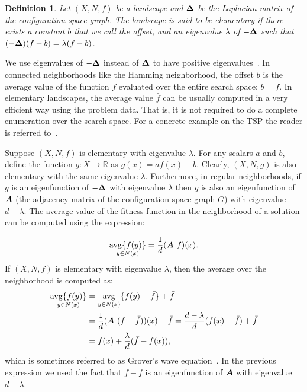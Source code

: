 \documentclass{article}
\newtheorem{definition}{Definition}
\newcommand{\avg}[1]{\mathop{\mathrm{avg} \{f(y)\}}_{y \in #1}}
\def\vec#1{\mathchoice{\mbox{\boldmath$\displaystyle#1$}}
  {\mbox{\boldmath$\textstyle#1$}}
  {\mbox{\boldmath$\scriptstyle#1$}}
  {\mbox{\boldmath$\scriptscriptstyle#1$}}}
\newcommand{\Real}[0]{\mathbb{R}}
\begin{document}
\begin{definition}
Let $(X, N, f)$ be a landscape and $\vec{\Delta}$ be the Laplacian matrix of the configuration space graph. The landscape is said to be elementary if there exists a constant $b$ that we call the \emph{offset}, and an eigenvalue $\lambda$ of $-\vec{\Delta}$ such that $(-\vec{\Delta}) (f-b) = \lambda (f-b)$. 
\end{definition}

We use eigenvalues of $-\vec{\Delta}$ instead of $\vec{\Delta}$ to have positive eigenvalues~\citep{Biyikoglu2007}. In connected neighborhoods like the Hamming neighborhood, the offset $b$ is the average value of the function $f$ evaluated over the entire search space: $b=\bar{f}$. In elementary landscapes, the average value $\bar{f}$ can be usually computed in a very efficient way using the problem data. That is, it is not required to do a complete enumeration over the search space. For a concrete example on the TSP the reader is referred to~\cite{Whitley2008}.

Suppose $(X,N,f)$ is elementary with eigenvalue $\lambda$. For any scalars $a$ and $b$, define the function $g : X \to \Real$ as $g(x) = af(x) + b$. Clearly, $(X,N,g)$ is also elementary with the same eigenvalue $\lambda$. Furthermore, in regular neighborhoods, if $g$ is an eigenfunction of $-\vec{\Delta}$ with eigenvalue $\lambda$ then $g$ is also an eigenfunction of $\vec{A}$ (the adjacency matrix of the configuration space graph $G$) with eigenvalue $d-\lambda$. The average value of the fitness function in the neighborhood of a solution can be computed using the expression:

\begin{equation}
\label{eqn:avg} \avg{N(x)} = \frac{1}{d} (\vec{A} ~f) (x).
\end{equation}
If $(X,N,f)$ is elementary with eigenvalue $\lambda$, then the average over the neighborhood is computed as:
\begin{align}
\nonumber \avg{N(x)} &= \mathop{\mathrm{avg}}_{y \in N(x)} \{f(y)-\bar{f}\} + \bar{f} \\
\nonumber &= \frac{1}{d} (\vec{A} ~(f-\bar{f})) (x) + \bar{f}= \frac{d-\lambda}{d} (f(x)-\bar{f}) + \bar{f} \\
&= f(x) + \frac{\lambda}{d} (\bar{f} -f(x)),
\end{align}
which is sometimes referred to as Grover's wave equation~\citep{Grover1992local}. In the previous expression we used the fact that $f-\bar{f}$ is an eigenfunction of $\vec{A}$ with eigenvalue
$d-\lambda$.
\end{document}
